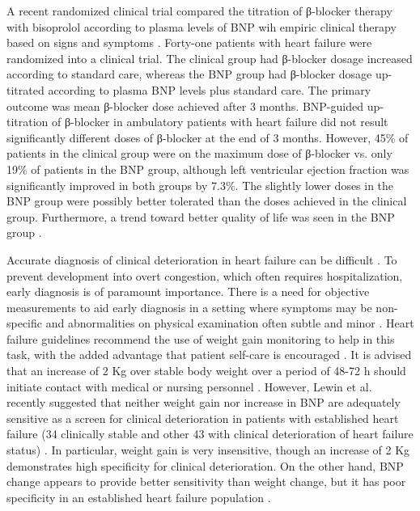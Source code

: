 \documentclass[14pt,a4paper,onecolumn]{extarticle}
\begin{document}
A recent randomized clinical trial compared the titration of β-blocker therapy with bisoprolol according to plasma levels of BNP wih empiric clinical therapy based on signs and
symptoms \citep{bib3294}. Forty-one patients with heart failure were randomized into a clinical
trial. The clinical group had β-blocker dosage increased according to standard care, whereas the BNP group had β-blocker dosage up-titrated according to plasma BNP levels plus
standard care. The primary outcome was mean β-blocker dose achieved after 3 months.
BNP-guided up-titration of β-blocker in ambulatory patients with heart failure did not result
significantly different doses of β-blocker at the end of 3 months. However, 45\% of patients
in the clinical group were on the maximum dose of β-blocker vs. only 19\% of patients in
the BNP group, although left ventricular ejection fraction was significantly improved in
both groups by 7.3\%. The slightly lower doses in the BNP group were possibly better tolerated than the doses achieved in the clinical group. Furthermore, a trend toward better
quality of life was seen in the BNP group \citep{bib3294}.

Accurate diagnosis of clinical deterioration in heart failure can be difficult \citep{bib368} \citep{bib369}. To
prevent development into overt congestion, which often requires hospitalization, early
diagnosis is of paramount importance. There is a need for objective measurements to aid
early diagnosis in a setting where symptoms may be non-specific and abnormalities on
physical examination often subtle and minor \citep{bib3295}. Heart failure guidelines recommend
the use of weight gain monitoring to help in this task, with the added advantage that
patient self-care is encouraged \citep{bib368} \citep{bib369}. It is advised that an increase of 2 Kg over stable
body weight over a period of 48-72 h should initiate contact with medical or nursing
personnel \citep{bib368} \citep{bib369} \citep{bib3295}. However, Lewin et al. recently suggested that neither weight gain
nor increase in BNP are adequately sensitive as a screen for clinical deterioration in
patients with established heart failure (34 clinically stable and other 43 with clinical
deterioration of heart failure status) \citep{bib3295}. In particular, weight gain is very insensitive,
though an increase of 2 Kg demonstrates high specificity for clinical deterioration. On
the other hand, BNP change appears to provide better sensitivity than weight change, but
it has poor specificity in an established heart failure population \citep{bib3295}.
\end{document}
